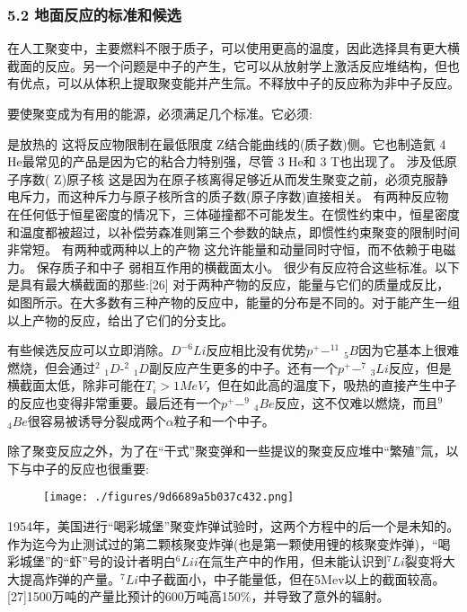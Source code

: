 \subsubsection{5.2 地面反应的标准和候选}
在人工聚变中，主要燃料不限于质子，可以使用更高的温度，因此选择具有更大横截面的反应。另一个问题是中子的产生，它可以从放射学上激活反应堆结构，但也有优点，可以从体积上提取聚变能并产生氚。不释放中子的反应称为非中子反应。

要使聚变成为有用的能源，必须满足几个标准。它必须:

是放热的
这将反应物限制在最低限度 Z结合能曲线的(质子数)侧。它也制造氦 4 He最常见的产品是因为它的粘合力特别强，尽管 3 He和 3 T也出现了。
涉及低原子序数( Z)原子核
这是因为在原子核离得足够近从而发生聚变之前，必须克服静电斥力，而这种斥力与原子核所含的质子数(原子序数)直接相关。
有两种反应物
在任何低于恒星密度的情况下，三体碰撞都不可能发生。在惯性约束中，恒星密度和温度都被超过，以补偿劳森准则第三个参数的缺点，即惯性约束聚变的限制时间非常短。
有两种或两种以上的产物
这允许能量和动量同时守恒，而不依赖于电磁力。
保存质子和中子
弱相互作用的横截面太小。
很少有反应符合这些标准。以下是具有最大横截面的那些:[26]
对于两种产物的反应，能量与它们的质量成反比，如图所示。在大多数有三种产物的反应中，能量的分布是不同的。对于能产生一组以上产物的反应，给出了它们的分支比。

有些候选反应可以立即消除。$D^{-6}Li$反应相比没有优势$p^{+}-^{11}$ $_{5}B$因为它基本上很难燃烧，但会通过$^{2}$ $_1D$-$^{2}$ $_1D$副反应产生更多的中子。还有一个$p^{+}-^{7}$ $_{3}Li$反应，但是横截面太低，除非可能在$T_i> 1 MeV$，但在如此高的温度下，吸热的直接产生中子的反应也变得非常重要。最后还有一个$p^{+}-^{9}$ $_{4}Be$反应，这不仅难以燃烧，而且$^{9}$ $_{4}Be$很容易被诱导分裂成两个$\alpha$粒子和一个中子。

除了聚变反应之外，为了在“干式”聚变弹和一些提议的聚变反应堆中“繁殖”氚，以下与中子的反应也很重要:
\begin{figure}[ht]
\centering
\texttt{[image: ./figures/9d6689a5b037c432.png]}
\caption\label{fig_HJB_7}
\end{figure}
1954年，美国进行“喝彩城堡”聚变炸弹试验时，这两个方程中的后一个是未知的。作为迄今为止测试过的第二颗核聚变炸弹(也是第一颗使用锂的核聚变炸弹)，“喝彩城堡”的“虾”号的设计者明白$^6Lii$在氚生产中的作用，但未能认识到$^7Li$裂变将大大提高炸弹的产量。$^7Li$中子截面小，中子能量低，但在5Mev以上的截面较高。[27]1500万吨的产量比预计的600万吨高150\%，并导致了意外的辐射。

